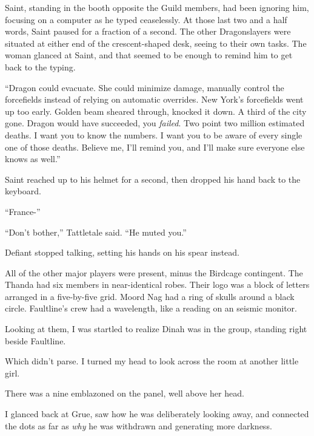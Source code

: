 Saint, standing in the booth opposite the Guild members, had been ignoring him, focusing on a computer as he typed ceaselessly.  At those last two and a half words, Saint paused for a fraction of a second.  The other Dragonslayers were situated at either end of the crescent-shaped desk, seeing to their own tasks.  The woman glanced at Saint, and that seemed to be enough to remind him to get back to the typing.



``Dragon could evacuate.  She could minimize damage, manually control the forcefields instead of relying on automatic overrides.  New York's forcefields went up too early.  Golden beam sheared through, knocked it down.  A third of the city gone.  Dragon would have succeeded, you \emph{failed}.  Two point two million estimated deaths.  I want you to know the numbers.  I want you to be aware of every single one of those deaths.  Believe me, I'll remind you, and I'll make sure everyone else knows as well.''



Saint reached up to his helmet for a second, then dropped his hand back to the keyboard.



``France-''



``Don't bother,'' Tattletale said.  ``He muted you.''



Defiant stopped talking, setting his hands on his spear instead.



All of the other major players were present, minus the Birdcage contingent.  The Thanda had six members in near-identical robes.  Their logo was a block of letters arranged in a five-by-five grid.  Moord Nag had a ring of skulls around a black circle.  Faultline's crew had a wavelength, like a reading on an seismic monitor.



Looking at them, I was startled to realize Dinah was in the group, standing right beside Faultline.



Which didn't parse.  I turned my head to look across the room at another little girl.



There was a nine emblazoned on the panel, well above her head.



I glanced back at Grue, saw how he was deliberately looking away, and connected the dots as far as \emph{why} he was withdrawn and generating more darkness.



